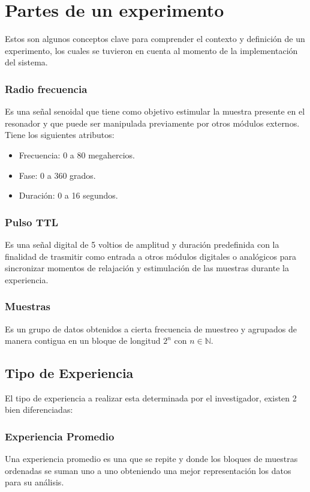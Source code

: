 \section{Partes de un experimento}

Estos son algunos conceptos clave para comprender el contexto y definici\'on de un
experimento, los cuales se tuvieron en cuenta al momento de la implementaci\'on 
del sistema.

\subsubsection{Radio frecuencia}
Es una se\~nal senoidal que tiene como objetivo
estimular la muestra presente en el resonador
y que puede ser manipulada previamente
por otros m\'odulos externos. Tiene los siguientes atributos:
    \begin{itemize}
        \item Frecuencia: 0 a 80 megahercios.
        \item Fase: 0 a 360 grados.
        \item Duraci\'on: 0 a 16 segundos.
    \end{itemize}

\subsubsection{Pulso TTL}
Es una se\~nal digital de 5 voltios de amplitud y duraci\'on predefinida con la finalidad de trasmitir como entrada a otros m\'odulos digitales o anal\'ogicos para sincronizar momentos de relajaci\'on y estimulaci\'on de las muestras durante la experiencia.

\subsubsection{Muestras}
Es un grupo de datos obtenidos a cierta frecuencia de muestreo y agrupados de manera contigua 
en un bloque de longitud $2^{n}$ con $n \in \mathbb{N}$. 

\subsection{Tipo de Experiencia}
El tipo de experiencia a realizar esta determinada por el investigador, existen 2 bien diferenciadas:

\subsubsection{Experiencia Promedio}
Una experiencia promedio es una que se repite y donde los bloques de muestras ordenadas se suman uno a uno obteniendo
una mejor representaci\'on los datos para su an\'alisis.

